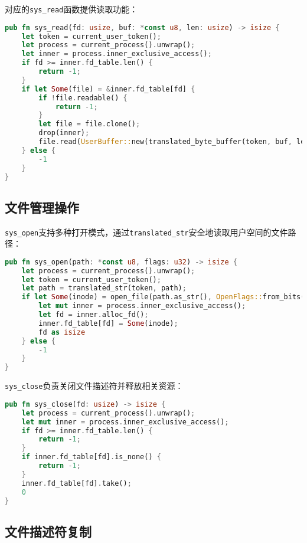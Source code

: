 对应的\texttt{sys\_read}函数提供读取功能：

\begin{lstlisting}[language=Rust,caption={文件读取系统调用}, label={lst:sys-read}]
pub fn sys_read(fd: usize, buf: *const u8, len: usize) -> isize {
    let token = current_user_token();
    let process = current_process().unwrap();
    let inner = process.inner_exclusive_access();
    if fd >= inner.fd_table.len() {
        return -1;
    }
    if let Some(file) = &inner.fd_table[fd] {
        if !file.readable() {
            return -1;
        }
        let file = file.clone();
        drop(inner);
        file.read(UserBuffer::new(translated_byte_buffer(token, buf, len))) as isize
    } else {
        -1
    }
}
\end{lstlisting}

\subsection{文件管理操作}

\texttt{sys\_open}支持多种打开模式，通过\texttt{translated\_str}安全地读取用户空间的文件路径：

\begin{lstlisting}[language=Rust,caption={文件打开系统调用}, label={lst:sys-open}]
pub fn sys_open(path: *const u8, flags: u32) -> isize {
    let process = current_process().unwrap();
    let token = current_user_token();
    let path = translated_str(token, path);
    if let Some(inode) = open_file(path.as_str(), OpenFlags::from_bits(flags).unwrap()) {
        let mut inner = process.inner_exclusive_access();
        let fd = inner.alloc_fd();
        inner.fd_table[fd] = Some(inode);
        fd as isize
    } else {
        -1
    }
}
\end{lstlisting}

\texttt{sys\_close}负责关闭文件描述符并释放相关资源：

\begin{lstlisting}[language=Rust,caption={文件关闭系统调用}, label={lst:sys-close}]
pub fn sys_close(fd: usize) -> isize {
    let process = current_process().unwrap();
    let mut inner = process.inner_exclusive_access();
    if fd >= inner.fd_table.len() {
        return -1;
    }
    if inner.fd_table[fd].is_none() {
        return -1;
    }
    inner.fd_table[fd].take();
    0
}
\end{lstlisting}

\subsection{文件描述符复制}

